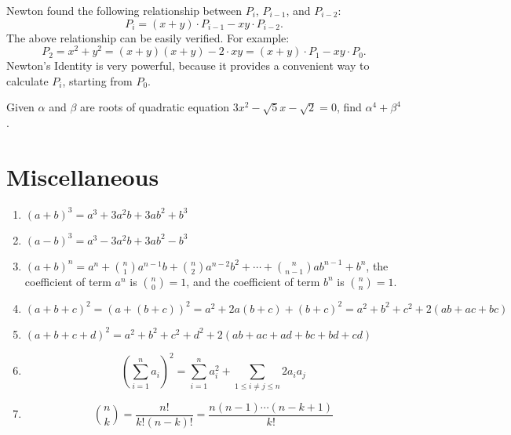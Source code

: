 \documentclass[11pt, oneside]{article}   	%
\begin{document}
Newton found the following relationship between $P_i$,  $P_{i-1}$,  and $P_{i-2}$: 
\[ P_i=(x+y)\cdot P_{i-1}-xy\cdot P_{i-2}. \]
The above relationship can be easily verified. For example: 
\[P_2=x^2+y^2=(x+y)(x+y)-2 \cdot xy = (x+y)\cdot P_1- xy \cdot P_0. \]
Newton's Identity is very powerful, because it provides a convenient way to calculate $P_i$, starting from $P_0$. 

Given $\alpha$ and $\beta$ are roots of quadratic equation $3x^2-\sqrt{5}x-\sqrt{2}=0$, find $\alpha^4 + \beta^4$. 


\newpage 
\section{Miscellaneous} 
\begin{enumerate}
\item $(a+b)^3=a^3+3a^2b+3ab^2+b^3$ 
\item $(a-b)^3=a^3-3a^2b+3ab^2-b^3$ 
\item $(a+b)^n=a^n+\binom{n}{1}a^{n-1}b+\binom{n}{2}a^{n-2}b^2+\cdots+\binom{n}{n-1}ab^{n-1}+b^n$, the coefficient of term $a^n$ is $\binom{n}{0}=1$, and the coefficient of term $b^n$ is $\binom{n}{n}=1$. 
\item $(a+b+c)^2=(a+(b+c))^2=a^2+2a(b+c)+(b+c)^2=a^2+b^2+c^2+2(ab+ac+bc)$
\item $(a+b+c+d)^2=a^2+b^2+c^2+d^2+2(ab+ac+ad+bc+bd+cd)$
\item \[\left(\sum^n_{i=1} a_i\right)^2=\sum^n_{i=1} a_i^2+\sum_{1 \le i \ne j \le n} 2a_i a_j \]
\item \[\binom{n}{k}=\frac{n!}{k!(n-k)!}=\frac{n(n-1)\cdots(n-k+1)}{k!}\]
\end{enumerate}







\end{document}

